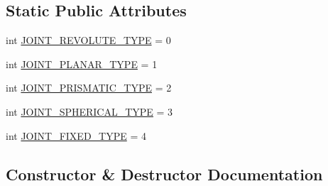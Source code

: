 \subsection*{Static Public Attributes}
\begin{DoxyCompactItemize}
\item 
int \hyperlink{classpybullet-gym_1_1pybulletgym_1_1envs_1_1roboschool_1_1robots_1_1robot__bases_1_1_joint_a5ea32c17c112b92c34154907bcbafd5c}{J\+O\+I\+N\+T\+\_\+\+R\+E\+V\+O\+L\+U\+T\+E\+\_\+\+T\+Y\+PE} = 0
\item 
int \hyperlink{classpybullet-gym_1_1pybulletgym_1_1envs_1_1roboschool_1_1robots_1_1robot__bases_1_1_joint_ae59caf0cb0d414d7d3410d5abb5ee22b}{J\+O\+I\+N\+T\+\_\+\+P\+L\+A\+N\+A\+R\+\_\+\+T\+Y\+PE} = 1
\item 
int \hyperlink{classpybullet-gym_1_1pybulletgym_1_1envs_1_1roboschool_1_1robots_1_1robot__bases_1_1_joint_a769ceac390c46d5fb7efea86eeead0b2}{J\+O\+I\+N\+T\+\_\+\+P\+R\+I\+S\+M\+A\+T\+I\+C\+\_\+\+T\+Y\+PE} = 2
\item 
int \hyperlink{classpybullet-gym_1_1pybulletgym_1_1envs_1_1roboschool_1_1robots_1_1robot__bases_1_1_joint_ae359430c3ce8c91d65725ec26a5b4133}{J\+O\+I\+N\+T\+\_\+\+S\+P\+H\+E\+R\+I\+C\+A\+L\+\_\+\+T\+Y\+PE} = 3
\item 
int \hyperlink{classpybullet-gym_1_1pybulletgym_1_1envs_1_1roboschool_1_1robots_1_1robot__bases_1_1_joint_a04bc0499f4e03f831601c7057cfc02fe}{J\+O\+I\+N\+T\+\_\+\+F\+I\+X\+E\+D\+\_\+\+T\+Y\+PE} = 4
\end{DoxyCompactItemize}


\subsection{Constructor \& Destructor Documentation}
